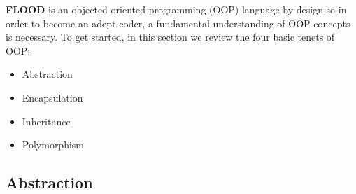 \documentclass[12pt]{report}
\begin{document}
\begin{doublespace}
\textbf{FLOOD} is an objected oriented programming (OOP) language by design so in order to become an adept coder, a fundamental understanding of OOP concepts is necessary. To get started, in this section we review the four basic tenets of OOP:
\begin{itemize}
\setlength{\itemsep}{1pt}
\item Abstraction
\item Encapsulation
\item Inheritance
\item Polymorphism
\end{itemize}
\end{doublespace}

\subsection{Abstraction}
\end{document}
